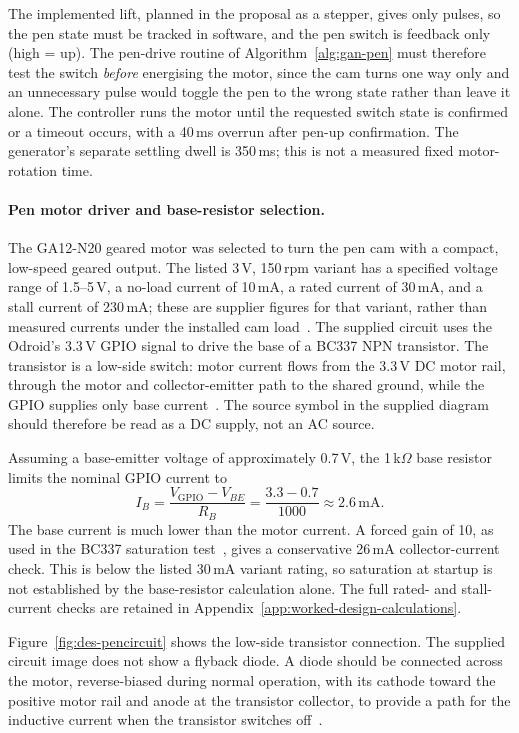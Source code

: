 The implemented lift, planned in the proposal as a stepper, gives only pulses, so the pen state must be tracked in software, and the pen switch is feedback only (high = up). The pen-drive routine of Algorithm~\ref{alg:gan-pen} must therefore test the switch \emph{before} energising the motor, since the cam turns one way only and an unnecessary pulse would toggle the pen to the wrong state rather than leave it alone. The controller runs the motor until the requested switch state is confirmed or a timeout occurs, with a 40\,ms overrun after pen-up confirmation. The generator's separate settling dwell is 350\,ms; this is not a measured fixed motor-rotation time.

\paragraph{Pen motor driver and base-resistor selection.}
The GA12-N20 geared motor was selected to turn the pen cam with a compact, low-speed geared output. The listed 3\,V, 150\,rpm variant has a specified voltage range of 1.5--5\,V, a no-load current of 10\,mA, a rated current of 30\,mA, and a stall current of 230\,mA; these are supplier figures for that variant, rather than measured currents under the installed cam load~\cite{ga12n20ds}. The supplied circuit uses the Odroid's 3.3\,V GPIO signal to drive the base of a BC337 NPN transistor. The transistor is a low-side switch: motor current flows from the 3.3\,V DC motor rail, through the motor and collector-emitter path to the shared ground, while the GPIO supplies only base current~\cite{odroidn2ds}. The source symbol in the supplied diagram should therefore be read as a DC supply, not an AC source.

Assuming a base-emitter voltage of approximately 0.7\,V, the 1\,k$\Omega$ base resistor limits the nominal GPIO current to
\begin{equation}
I_B = \frac{V_{\mathrm{GPIO}}-V_{BE}}{R_B} = \frac{3.3-0.7}{1000} \approx 2.6\,\mathrm{mA}.
\label{eq:des-basecurrent}
\end{equation}
The base current is much lower than the motor current. A forced gain of 10, as used in the BC337 saturation test~\cite{bc337ds}, gives a conservative 26\,mA collector-current check. This is below the listed 30\,mA variant rating, so saturation at startup is not established by the base-resistor calculation alone. The full rated- and stall-current checks are retained in Appendix~\ref{app:worked-design-calculations}.

Figure~\ref{fig:des-pencircuit} shows the low-side transistor connection. The supplied circuit image does not show a flyback diode. A diode should be connected across the motor, reverse-biased during normal operation, with its cathode toward the positive motor rail and anode at the transistor collector, to provide a path for the inductive current when the transistor switches off~\cite{rohmlowside2026}.

